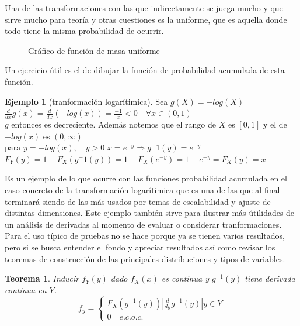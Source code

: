 \documentclass[11pt,a4paper,oneside]{report}
\theoremstyle{definition}
\newtheorem{ejemplo}[definicion]{Ejemplo}
\theoremstyle{plain}
\newtheorem{teorema}[definicion]{Teorema}
\theoremstyle{remark}
\begin{document}
Una de las transformaciones con las que indirectamente se juega mucho y que sirve mucho para teoría y otras 
cuestiones es la uniforme, que es aquella donde todo tiene la misma probabilidad de ocurrir. 

\begin{figure}[H]
  \centering
  \caption{Gráfico de función de masa uniforme}
\end{figure}

Un ejercicio útil es el de dibujar la función de probabilidad acumulada de esta función.

\begin{ejemplo}[tranformación logarítimica]
  Sea $g(X) = -log(X)$\\
  $\frac{d}{dx}g(x)=\frac{d}{dx}(-log(x))=\frac{-1}{x}<0 \quad \forall x \in (0,1)$\\
  $g$ entonces es decreciente. Además notemos que el rango de $X$ es $[0,1]$ y el de 
  $-log(x)$ es $(0,\infty)$\\
  para $y=-log(x), \quad y>0$ $x=e^{-y}\Rightarrow g^-1(y)=e^{-y}$\\
  $F_Y(y)=1-F_X(g^-1(y))=1-F_X(e^{-y})=1-e^{-y}=F_X(y)=x$
\end{ejemplo}
Es un ejemplo de lo que ocurre con las funciones probabilidad acumulada en el caso concreto de 
la transformación logarítimica que es una de las que al final terminará siendo de las más usados por 
temas de escalabilidad y ajuste de distintas dimensiones. Este ejemplo también sirve para ilustrar 
más útilidades de un análisis de derivadas al momento de evaluar o considerar tranformaciones. 
Para el uso típico de pruebas no se hace porque ya se tienen varios resultados, pero si se busca entender
el fondo y apreciar resultados así como revisar los teoremas de construcción de las principales distribuciones
y tipos de variables.

\begin{teorema}
  Inducir $f_Y(y)$ dado $f_X(x)$ es continua y $g^{-1}(y)$ tiene derivada continua en $Y$. 
  \[f_y=\left\{
  \begin{array}{l}
    F_X(g^{-1}(y)) | \frac{d}{dy} g^{-1}(y) | y\in Y \\
    0 \quad e.c.o.c.
  \end{array}
\right.\]
\end{teorema}
\end{document}
